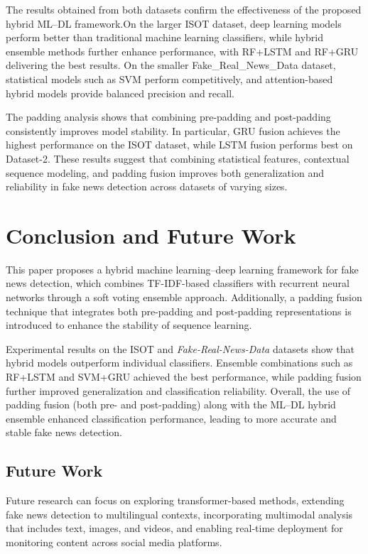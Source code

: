 \documentclass[conference]{IEEEtran}
\begin{document}
The results obtained from both datasets confirm the effectiveness of the proposed hybrid ML–DL framework.On the larger ISOT dataset, deep learning models perform better than traditional machine learning classifiers, while hybrid ensemble methods further enhance performance, with RF+LSTM and RF+GRU delivering the best results. On the smaller Fake\_Real\_News\_Data dataset, statistical models such as SVM perform competitively, and attention-based hybrid models provide balanced precision and recall. 

The padding analysis shows that combining pre-padding and post-padding consistently improves model stability. In particular, GRU fusion achieves the highest performance on the ISOT dataset, while LSTM fusion performs best on Dataset-2. These results suggest that combining statistical features, contextual sequence modeling, and padding fusion improves both generalization and reliability in fake news detection across datasets of varying sizes.
\section{Conclusion and Future Work}
\label{sec:conc}

This paper proposes a hybrid machine learning–deep learning framework for fake news detection, which combines TF-IDF-based classifiers with recurrent neural networks through a soft voting ensemble approach. Additionally, a padding fusion technique that integrates both pre-padding and post-padding representations is introduced to enhance the stability of sequence learning.

Experimental results on the ISOT and \textit{Fake-Real-News-Data} datasets show that hybrid models outperform individual classifiers. Ensemble combinations such as RF+LSTM and SVM+GRU achieved the best performance, while padding fusion further improved generalization and classification reliability.
Overall, the use of padding fusion (both pre- and post-padding) along with the ML–DL hybrid ensemble enhanced classification performance, leading to more accurate and stable fake news detection.

\subsection{Future Work}
Future research can focus on exploring transformer-based methods, extending fake news detection to multilingual contexts, incorporating multimodal analysis that includes text, images, and videos, and enabling real-time deployment for monitoring content across social media platforms.
\end{document}
